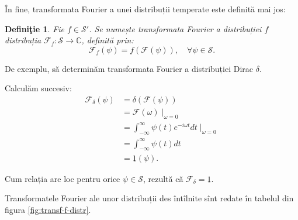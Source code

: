 \documentclass[12pt,a4paper]{article}
\newcommand\kal{\mathcal}
\newcommand\CC{\mathbb{C}}
\theoremstyle{dotless}
\theoremstyle{dotlessdr}
\newtheorem{definition}{Defini\c{t}ie}
\begin{document}
În fine, transformata Fourier a unei distribuții temperate este definită mai jos:

\begin{definition}\label{def:transf-f-distr}
  Fie $ f \in \kal{S}' $. Se numește \emph{transformata Fourier a distribuției $ f $}
  distribuția $ \kal{F}_f : \kal{S} \to \CC $, definită prin:
  \[
    \kal{F}_f(\psi) = f(\kal{F}(\psi)), \quad \forall \psi \in \kal{S}.
  \]
\end{definition}

De exemplu, să determinăm transformata Fourier a distribuției Dirac $ \delta $.

Calculăm succesiv:
\begin{align*}
  \kal{F}_\delta(\psi) &= \delta(\kal{F}(\psi)) \\
                       &= \kal{F}(\omega)\mid_{\omega = 0} \\
                       &= \int_{-\infty}^\infty \psi(t) e^{-i\omega t} dt \mid_{\omega = 0} \\
                       &= \int_{-\infty}^\infty \psi(t) dt \\
                       &= \underline{1}(\psi).
\end{align*}

Cum relația are loc pentru orice $ \psi \in \kal{S} $, rezultă că
$ \kal{F}_\delta = \underline{1} $.

\vspace{1cm}

Transformatele Fourier ale unor distribuții des întîlnite sînt redate în tabelul
din figura \ref{fig:transf-f-distr}.
\end{document}
